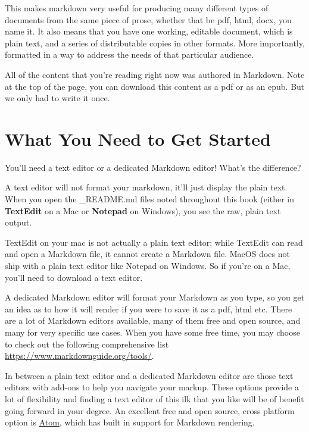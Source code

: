 \documentclass[
]{book}
\begin{document}
This makes markdown very useful for producing many different types of documents from the same piece of prose, whether that be pdf, html, docx, you name it. It also means that you have one working, editable document, which is plain text, and a series of distributable copies in other formats. More importantly, formatted in a way to address the needs of that particular audience.

All of the content that you're reading right now was authored in Markdown. Note at the top of the page, you can download this content as a pdf or as an epub. But we only had to write it once.

\hypertarget{what-you-need-to-get-started}{%
\section{What You Need to Get Started}\label{what-you-need-to-get-started}}

You'll need a text editor or a dedicated Markdown editor! What's the difference?

A text editor will not format your markdown, it'll just display the plain text. When you open the \_README.md files noted throughout this book (either in \textbf{TextEdit} on a Mac or \textbf{Notepad} on Windows), you see the raw, plain text output.

TextEdit on your mac is not actually a plain text editor; while TextEdit can read and open a Markdown file, it cannot create a Markdown file. MacOS does not ship with a plain text editor like Notepad on Windows. So if you're on a Mac, you'll need to download a text editor.

A dedicated Markdown editor will format your Markdown as you type, so you get an idea as to how it will render if you were to save it as a pdf, html etc. There are a lot of Markdown editors available, many of them free and open source, and many for very specific use cases. When you have some free time, you may choose to check out the following comprehensive list \url{https://www.markdownguide.org/tools/}.

In between a plain text editor and a dedicated Markdown editor are those text editors with add-ons to help you navigate your markup. These options provide a lot of flexibility and finding a text editor of this ilk that you like will be of benefit going forward in your degree. An excellent free and open source, cross platform option is \href{https://atom.io/}{Atom}, which has built in support for Markdown rendering.
\end{document}
